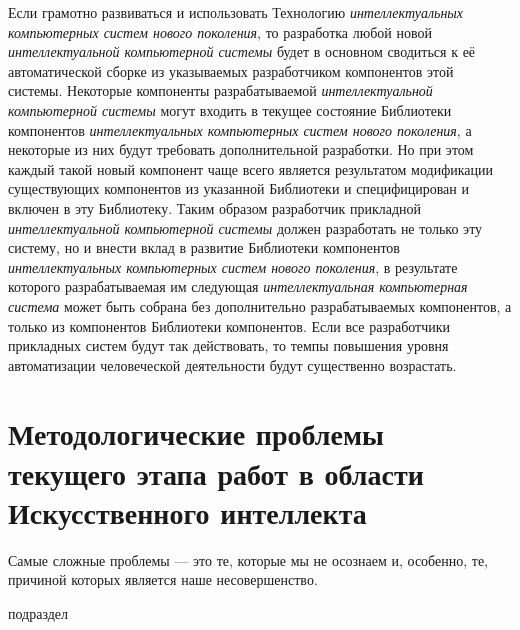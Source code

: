 \begin{textitemize}
\begin{textitemize}
		Если грамотно развиваться и использовать Технологию \textit{интеллектуальных компьютерных систем нового поколения}, то разработка любой новой \textit{интеллектуальной компьютерной системы} будет в основном сводиться к её автоматической сборке из указываемых разработчиком компонентов этой системы. Некоторые компоненты разрабатываемой \textit{интеллектуальной компьютерной системы} могут входить в текущее состояние Библиотеки компонентов \textit{интеллектуальных компьютерных систем нового поколения}, а некоторые из них будут требовать дополнительной разработки. Но при этом каждый такой новый компонент чаще всего является результатом модификации существующих компонентов из  указанной Библиотеки и  специфицирован и включен в эту Библиотеку. Таким образом разработчик прикладной \textit{интеллектуальной компьютерной системы} должен разработать не только эту систему, но и внести вклад в развитие Библиотеки компонентов \textit{интеллектуальных компьютерных систем нового поколения}, в результате которого разрабатываемая им следующая \textit{интеллектуальная компьютерная система} может быть собрана без дополнительно разрабатываемых компонентов, а только из компонентов Библиотеки компонентов. Если все разработчики прикладных систем будут так действовать, то темпы повышения уровня автоматизации человеческой деятельности будут существенно возрастать.
	\end{textitemize}
\end{textitemize}

\section*{Методологические проблемы текущего этапа работ в области Искусственного интеллекта}
\label{concl_methodological_problems_current_stage_work_field_AI}

\begin{SCn}
	{Самые сложные проблемы --- это те, которые мы не осознаем и, особенно, те, причиной которых является наше несовершенство.
	}
	
	\begin{scnrelfromlist}{подраздел}
	\end{scnrelfromlist}
\end{SCn}


